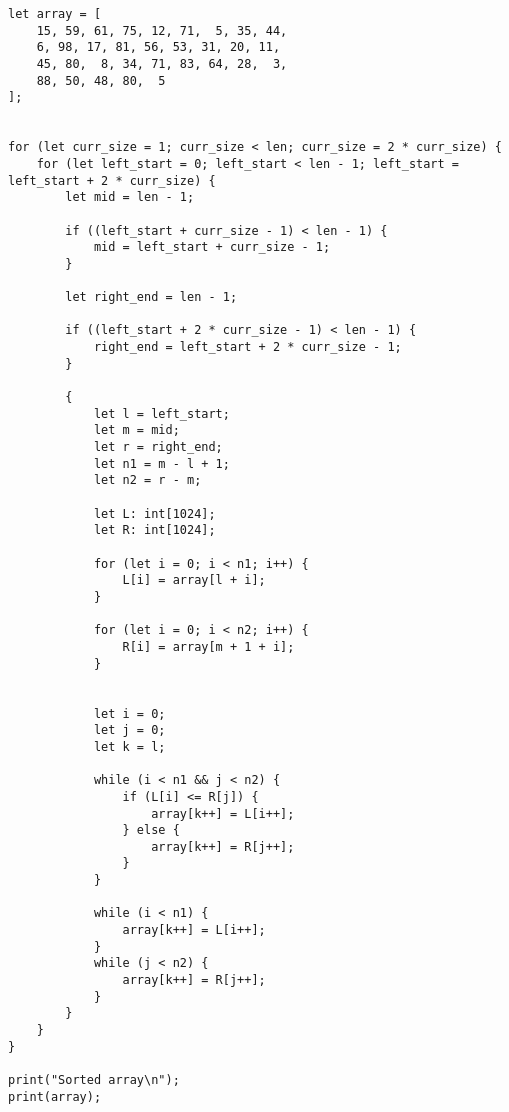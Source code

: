 \documentclass[a4paper]{article}
\begin{document}
\begin{lstlisting}[language=DPL]
let array = [
    15, 59, 61, 75, 12, 71,  5, 35, 44,
    6, 98, 17, 81, 56, 53, 31, 20, 11,
    45, 80,  8, 34, 71, 83, 64, 28,  3,
    88, 50, 48, 80,  5
];


for (let curr_size = 1; curr_size < len; curr_size = 2 * curr_size) {
    for (let left_start = 0; left_start < len - 1; left_start = left_start + 2 * curr_size) {
        let mid = len - 1;

        if ((left_start + curr_size - 1) < len - 1) {
            mid = left_start + curr_size - 1;
        }

        let right_end = len - 1;

        if ((left_start + 2 * curr_size - 1) < len - 1) {
            right_end = left_start + 2 * curr_size - 1;
        }

        {
            let l = left_start;
            let m = mid;
            let r = right_end;
            let n1 = m - l + 1;
            let n2 = r - m;

            let L: int[1024];
            let R: int[1024];

            for (let i = 0; i < n1; i++) {
                L[i] = array[l + i];
            }

            for (let i = 0; i < n2; i++) {
                R[i] = array[m + 1 + i];
            }


            let i = 0;
            let j = 0;
            let k = l;

            while (i < n1 && j < n2) {
                if (L[i] <= R[j]) {
                    array[k++] = L[i++];
                } else {
                    array[k++] = R[j++];
                }
            }

            while (i < n1) {
                array[k++] = L[i++];
            }
            while (j < n2) {
                array[k++] = R[j++];
            }
        }
    }
}

print("Sorted array\n");
print(array);
\end{lstlisting}


%

%
\end{document}

